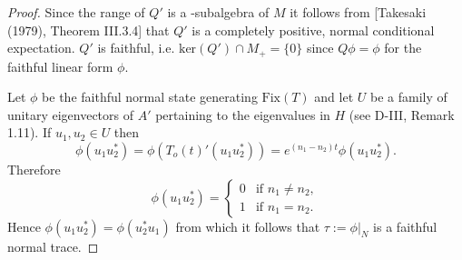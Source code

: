 \begin{proof}
Since the range of $Q'$ is a \WA-subalgebra of $M$ it follows from [Takesaki (1979), Theorem III.3.4] that $Q'$ is a completely positive, normal conditional expectation.
$Q'$ is faithful, i.e. $\text{ker}(Q') \cap M_{+} = \{0\}$ since $Q\phi = \phi$ for the faithful linear form $\phi$.

\newpage

Let $\phi$ be the faithful normal state generating $\text{Fix}(T)$ and let $U$ be a family of unitary eigenvectors of $A'$ pertaining to the eigenvalues in $H$ (see D-III, Remark 1.11).
If $u_{1}, u_{2} \in U$ then
\[
\phi(u_{1}u_{2}^*) = \phi(T_{o}(t)'(u_{1}u_{2}^*)) = e^{(n_{1}-n_{2})t}\phi(u_{1}u_{2}^*).
\]
Therefore
\[
\phi(u_{1}u_{2}^*) = \begin{cases} 0 & \text{if } n_{1} \neq n_{2}, \\ 1 & \text{if } n_{1} = n_{2}. \end{cases}
\]
Hence $\phi(u_{1}u_{2}^*) = \phi(u_{2}^*u_{1})$ from which it follows that $\tau := \phi|_{N}$ is a faithful normal trace.
\end{proof}

